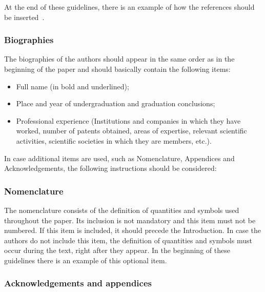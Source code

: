 \documentclass[english]{sobraep}
\begin{document}
At the end of these guidelines, there is an example of how the references should be inserted~\cite{refbib1,refbib2,refbib3,refbib4,refbib5,refbib6,refbib7,refbib8}.




\subsubsection{Biographies}

The biographies of the authors should appear in the same order as in the beginning of the paper and should basically contain the following items:
\begin{itemize}
	\item Full name (in bold and underlined);
	\item Place and year of undergraduation and graduation conclusions;
	\item Professional experience (Institutions and companies in which they have worked, number of patents obtained, areas of expertise, relevant scientific activities, scientific societies in which they are members, etc.). \newline
\end{itemize}

In case additional items are used, such as Nomenclature, Appendices and Acknowledgements, the following instructions should be considered:

\subsubsection{Nomenclature}

The nomenclature consists of the definition of quantities and symbols used throughout the paper. Its inclusion is not mandatory and this item must not be numbered. If this item is included, it should precede the Introduction. In case the authors do not include this item, the  definition of quantities and symbols must occur during the text, right after they appear. In the beginning of these guidelines there is an example of this optional item.

\subsubsection{Acknowledgements and appendices}
\end{document}
